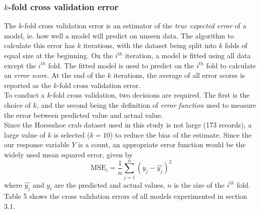 \documentclass[a4paper, 12pt]{article}
\begin{document}
\subsubsection{$k$-fold cross validation error}
The $k$-fold cross validation error is an estimator of the \textit{true expected error} of a model, ie. how well a model will predict on unseen data. The algorithm to calculate this error has $k$ iterations, with the dataset being split into $k$ folds of equal size at the beginning. On the $i^{th}$ iteration, a model is fitted using all data except the $i^{th}$ fold. The fitted model is used to predict on the $i^{th}$ fold to calculate an \textit{error score}. At the end of the $k$ iterations, the average of all error scores is reported as the $k$-fold cross validation error. \\
\indent To conduct a $k$-fold cross validation, two decisions are required. The first is the choice of $k$, and the second being the definition of \textit{error function} used to measure the error between predicted value and actual value. \\
\indent Since the Horseshoe crab dataset used in this study is not large (173 records), a large value of $k$ is selected ($k = 10$) to reduce the bias of the estimate. Since the our response variable $Y$ is a count, an appropriate error function would be the widely used mean squared error, given by
$$ \text{MSE}_i = \frac{1}{n}\sum_{j=1}^{n}(y_j - \hat{y_j})^2 $$
\noindent where $\hat{y_j}$ and $y_i$ are the predicted and actual values, $n$ is the size of the $i^{th}$ fold. Table 5 shows the cross validation errors of all models experimented in section 3.1.
\end{document}
